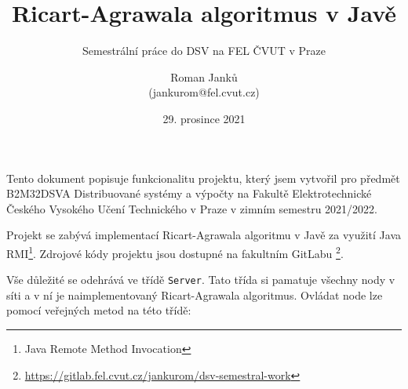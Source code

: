 \documentclass[11pt]{scrartcl}
\title{Ricart-Agrawala algoritmus v Javě}
\subtitle{Semestrální práce do DSV na FEL ČVUT v Praze}
\author{Roman Janků \\ (jankurom@fel.cvut.cz)}
\date{29. prosince 2021}
\begin{document}
    \maketitle

    Tento dokument popisuje funkcionalitu projektu, který jsem vytvořil pro předmět B2M32DSVA Distribuované systémy a
    výpočty na Fakultě Elektrotechnické Českého Vysokého Učení Technického v Praze v zimním semestru 2021/2022.

    Projekt se zabývá implementací Ricart-Agrawala algoritmu v Javě za využití Java RMI\footnote{Java Remote Method
    Invocation}. Zdrojové kódy projektu jsou dostupné na fakultním GitLabu
    \footnote{\url{https://gitlab.fel.cvut.cz/jankurom/dsv-semestral-work}}.

    Vše důležité se odehrává ve třídě \texttt{Server}. Tato třída si pamatuje všechny nody v síti a v ní je
    naimplementovaný Ricart-Agrawala algoritmus. Ovládat node lze pomocí veřejných metod na této třídě:
\end{document}
